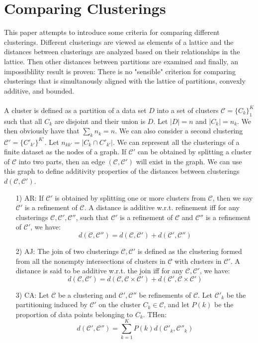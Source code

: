 \section{Comparing Clusterings}
    This paper attempts to introduce some criteria for comparing different clusterings. Different clusterings are viewed as elements of a lattice and the distances between clusterings are analyzed based on their relationships in the lattice. Then other distances between partitions are examined and finally, an impossiblility result is proven: There is no "sensible" criterion for comparing clusterings that is simultanously aligned with the lattice of partitions, convexly additive, and bounded. \\\\A cluster is defined as a partition of a data set $D$ into a set of clusters $\mathcal{C} = \{C_k\}_1^K$ such that all $C_k$ are disjoint and their union is $D$. Let $|D|=n$ and $|C_k|=n_k$. We then obviously have that $\sum_k n_k = n$. We can also consider a second clustering $\mathcal{C}' = \{C'_{k'}\}^{K'}$. Let $n_{k k'} = |C_k \cap C'_{k'}|$. We can represent all the clusterings of a finite dataset as the nodes of a graph. If $\mathcal{C}'$ can be obtained by splitting a cluster of $\mathcal{C}$ into two parts, then an edge $(\mathcal{C}, \mathcal{C}')$ will exist in the graph. We can use this graph to define additivity properties of the distances between clusterings $d(\mathcal{C}, \mathcal{C}')$.\\
    \begin{enumerate}
        \item[1) AR: ]
        If $\mathcal{C}'$ is obtained by splitting one or more clusters from $\mathcal{C}$, then we say $\mathcal{C}'$ is a refinement of $\mathcal{C}$. A distance is additive w.r.t. refinement iff for any clusterings $\mathcal{C}, \mathcal{C}', \mathcal{C}''$, such that $\mathcal{C}'$ is a refinement of $\mathcal{C}$ and $\mathcal{C}''$ is a refinement of $\mathcal{C}'$, we have:
        $$d(\mathcal{C},\mathcal{C}'') = d(\mathcal{C},\mathcal{C}')+d(\mathcal{C}',\mathcal{C}'')$$
        
        \item[2) AJ: ]
        The join of two clusterings $\mathcal{C}, \mathcal{C}'$ is defined as the clustering formed from all the nonempty intersections of clusters in $\mathcal{C}$ with clusters in $\mathcal{C}'$. A distance is said to be additive w.r.t. the join iff for any $\mathcal{C},\mathcal{C}'$, we have:
        $$d(\mathcal{C},\mathcal{C}') = d(\mathcal{C},\mathcal{C}\times \mathcal{C}')+d(\mathcal{C}', \mathcal{C}\times \mathcal{C}')$$
        
        \item[3) CA: ] Let $\mathcal{C}$ be a clustering and $\mathcal{C}', \mathcal{C}''$ be refinements of $\mathcal{C}$. Let $\mathcal{C}'_k$ be the partitioning induced by $\mathcal{C}'$ on the cluster $C_k \in \mathcal{C}$, and let $P(k)$ be the proportion of data points belonging to $C_k$. THen:
        $$d(\mathcal{C}',\mathcal{C}'') = \sum_{k=1}^K P(k)d(\mathcal{C}'_k,\mathcal{C}''_k)$$
    \end{enumerate}
    
